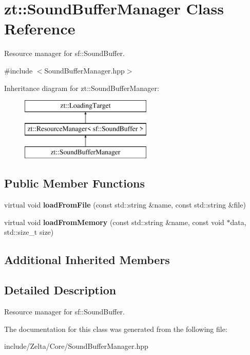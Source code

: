 \hypertarget{classzt_1_1_sound_buffer_manager}{}\section{zt\+:\+:Sound\+Buffer\+Manager Class Reference}
\label{classzt_1_1_sound_buffer_manager}


Resource manager for sf\+::\+Sound\+Buffer.  




{\ttfamily \#include $<$Sound\+Buffer\+Manager.\+hpp$>$}

Inheritance diagram for zt\+:\+:Sound\+Buffer\+Manager\+:\begin{figure}[H]
\begin{center}
\leavevmode
\includegraphics[height=3.000000cm]{classzt_1_1_sound_buffer_manager}
\end{center}
\end{figure}
\subsection*{Public Member Functions}
\begin{DoxyCompactItemize}
\item 
\mbox{\label{classzt_1_1_sound_buffer_manager_a6e49792172f215b99908fdcb0ce43cf1}} 
virtual void {\bfseries load\+From\+File} (const std\+::string \&name, const std\+::string \&file)
\item 
\mbox{\label{classzt_1_1_sound_buffer_manager_af9f12e257943e82ed68d1272a6e053af}} 
virtual void {\bfseries load\+From\+Memory} (const std\+::string \&name, const void $\ast$data, std\+::size\+\_\+t size)
\end{DoxyCompactItemize}
\subsection*{Additional Inherited Members}


\subsection{Detailed Description}
Resource manager for sf\+::\+Sound\+Buffer. 

The documentation for this class was generated from the following file\+:\begin{DoxyCompactItemize}
\item 
include/\+Zelta/\+Core/Sound\+Buffer\+Manager.\+hpp\end{DoxyCompactItemize}
